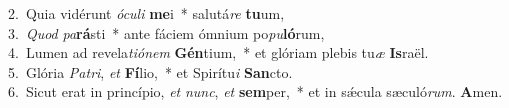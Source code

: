 {2.~}Quia vidérunt \textit{ó}\textit{cu}\textit{li} \textbf{me}i~* salutá\textit{re} \textbf{tu}um,\\
{3.~}\textit{Quod} \textit{pa}\textbf{rá}sti~* ante fáciem ómnium po\textit{pu}\textbf{ló}rum,\\
{4.~}Lumen ad revela\textit{ti}\textit{ó}\textit{nem} \textbf{Gén}tium,~* et glóriam plebis tu\textit{æ} \textbf{Is}raël.\\
{5.~}Glória \textit{Pa}\textit{tri}, \textit{et} \textbf{Fí}lio,~* et Spirítu\textit{i} \textbf{San}cto.\\
{6.~}Sicut erat in princípio, \textit{et} \textit{nunc}, \textit{et} \textbf{sem}per,~* et in sǽcula sæculó\textit{rum}. \textbf{A}men.\\
